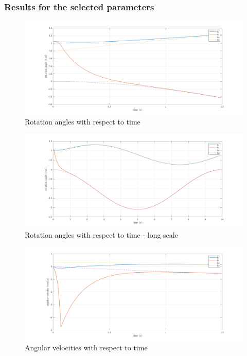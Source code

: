 \documentclass[a4paper]{article}
\begin{document}
\subsubsection{Results for the selected parameters}
\begin{figure}[H]
    \centering
    \includegraphics[width=15cm]{fig/sim2/q.png}
    \caption{Rotation angles with respect to time}
\end{figure}
\begin{figure}[H]
    \centering
    \includegraphics[width=15cm]{fig/sim2/qlong.png}
    \caption{Rotation angles with respect to time - long scale}
\end{figure}
\begin{figure}[H]
    \centering
    \includegraphics[width=15cm]{fig/sim2/qdot.png}
    \caption{Angular velocities with respect to time}
\end{figure}
\end{document}
